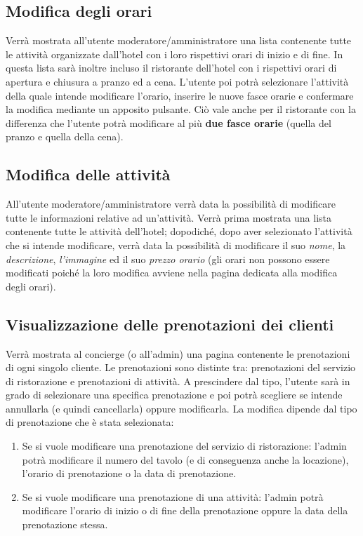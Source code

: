 \documentclass [a4paper, 12pt]{book}
\begin{document}
\medskip

\subsection{Modifica degli orari}
Verrà mostrata all'utente moderatore/amministratore una lista contenente tutte le attività organizzate dall'hotel con i loro rispettivi orari di inizio e di fine. In questa lista sarà inoltre incluso il ristorante dell'hotel con i rispettivi orari di apertura e chiusura a pranzo ed a cena. L'utente poi potrà selezionare l'attività della quale intende modificare l'orario, inserire le nuove fasce orarie e confermare la modifica mediante un apposito pulsante. Ciò vale anche per il ristorante con la differenza che l'utente potrà modificare al più \textbf{due fasce orarie} (quella del pranzo e quella della cena).

\medskip

\subsection{Modifica delle attività}
All'utente moderatore/amministratore verrà data la possibilità di modificare tutte le informazioni relative ad un'attività. Verrà prima mostrata una lista contenente tutte le attività dell'hotel; dopodiché, dopo aver selezionato l'attività che si intende modificare, verrà data la possibilità di modificare il suo \textit{nome}, la \textit{descrizione}, \textit{l'immagine} ed il suo \textit{prezzo orario} (gli orari non possono essere modificati poiché la loro modifica avviene nella pagina dedicata alla modifica degli orari).

\subsection{Visualizzazione delle prenotazioni dei clienti}
\label{VisualizzaPrenotazioniClienti}
Verrà mostrata al concierge (o all'admin) una pagina contenente le prenotazioni di ogni singolo cliente. Le prenotazioni sono distinte tra: prenotazioni del servizio di ristorazione e prenotazioni di attività. A prescindere dal tipo, l'utente sarà in grado di selezionare una specifica prenotazione e poi potrà scegliere se intende annullarla (e quindi cancellarla) oppure modificarla. La modifica dipende dal tipo di prenotazione che è stata selezionata:
\begin{enumerate}
\item Se si vuole modificare una prenotazione del servizio di ristorazione: l'admin potrà modificare il numero del tavolo (e di conseguenza anche la locazione), l'orario di prenotazione o la data di prenotazione.
\item Se si vuole modificare una prenotazione di una attività: l'admin potrà modificare l'orario di inizio o di fine della prenotazione oppure la data della prenotazione stessa.
\end{enumerate}
\end{document}
